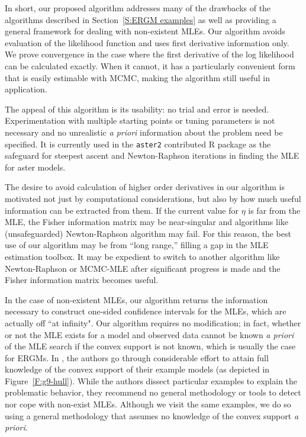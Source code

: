In short, our proposed algorithm addresses many of the drawbacks of the algorithms
described in Section~\ref{S:ERGM examples} as well as providing a general framework
for dealing with non-existent MLEs.  Our algorithm avoids evaluation of the 
likelihood function and uses first derivative information only.  
We prove convergence in the case where the first derivative of the log likelihood
can be calculated exactly.
When it cannot, it has a particularly convenient form that is 
easily estimable with MCMC, making the algorithm still useful in application.

The appeal of this algorithm is its usability: no trial and error is needed.  
Experimentation with multiple starting points or tuning parameters is not necessary 
and no unrealistic \emph{a priori} information about the problem need be specified.  
It is currently used in the \texttt{aster2} contributed R package 
\citep{aster:R} as the safeguard for steepest ascent and Newton-Raphson iterations in finding the MLE for aster models.

The desire to avoid calculation of higher order derivatives in our algorithm
is motivated not just by 
computational considerations, but 
also by how much useful information can be extracted from them.   
If the current value for $\eta$ is far from the MLE,  
the Fisher information matrix may be near-singular and algorithms like (unsafeguarded) 
Newton-Raphson algorithm may fail.  
For this 
reason, the best use of our algorithm may be from ``long range,'' filling a gap in the MLE estimation toolbox.  It may 
be expedient to switch to another algorithm like Newton-Raphson or MCMC-MLE 
after significant progress is made and the Fisher information matrix becomes useful.  


In the case of non-existent MLEs, our algorithm returns the information necessary
to construct one-sided confidence intervals for the MLEs, which are actually off 
``at infinity".  Our algorithm requires no modification; in fact,
whether or not the MLE exists for a model and observed data cannot be known \emph{a priori} 
of the MLE search if the convex support is not known, which is usually the case
for ERGMs.
In \citet{Handcock:degeneracy,Rinaldo:2009}, the authors 
go through considerable effort to attain full knowledge of 
the convex support of their example models (as depicted in Figure~\ref{F:g9-hull}).  While the authors dissect particular examples 
to explain the problematic behavior, they recommend no general methodology 
or tools to detect nor cope with non-exist MLEs.  Although we visit the same
examples, we do so using a general methodology that assumes no knowledge of the 
convex support \emph{a priori}.




